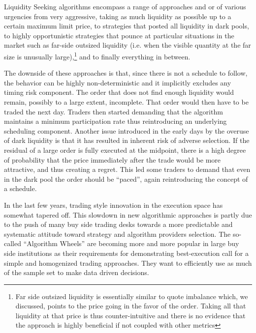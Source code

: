 Liquidity Seeking algorithms encompass a range of approaches and or of various urgencies from very aggressive, taking as much liquidity as possible up to a certain maximum limit price, to strategies that posted all liquidity in dark pools, to highly opportunistic strategies that pounce at particular situations in the market such as far-side outsized liquidity (i.e. when the visible quantity at the far size is unusually large),\footnote{Far side outsized liquidity is essentially similar to quote imbalance which, we discussed, points to the price going in the favor of the order. Taking all that liquidity at that price is thus counter-intuitive and there is no evidence that the approach is highly beneficial if not coupled with other metrics} and to finally everything in between.


The downside of these approaches is that, since there is not a schedule to follow, the behavior can be highly non-deterministic and it implicitly excludes any timing risk component. The order that does not find enough liquidity would remain, possibly to a large extent, incomplete. That order would then have to be traded the next day. Traders then started demanding that the algorithm maintains a minimum participation rate thus reintroducing an underlying scheduling component. Another issue introduced in the early days by the overuse of dark liquidity is that it has resulted in inherent risk of adverse selection. If the residual of a large order is fully executed at the midpoint, there is a high degree of probability that the price immediately after the trade would be more attractive, and thus creating a regret. This led some traders to demand that even in the dark pool the order should be ``paced'', again reintroducing the concept of a schedule.


In the last few years, trading style innovation in the execution space has somewhat tapered off. This slowdown in new algorithmic approaches is partly due to the push of many buy side trading desks towards a more predictable and systematic attitude toward strategy and algorithm providers selection. The so-called ``Algorithm Wheels'' are becoming more and more popular in large buy side institutions as their requirements for demonstrating best-execution call for a simple and homogenized trading approaches. They want to efficiently use as much of the sample set to make data driven decisions. 


